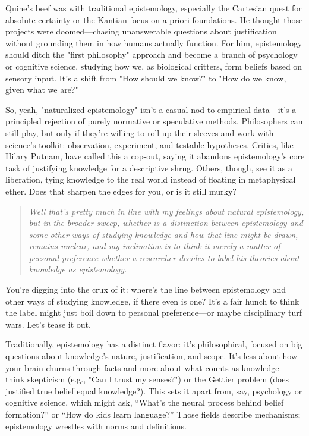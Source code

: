\documentclass[10pt,titlepage]{book}
\begin{document}
Quine’s beef was with traditional epistemology, especially the Cartesian quest for absolute certainty or the Kantian focus on a priori foundations. He thought those projects were doomed—chasing unanswerable questions about justification without grounding them in how humans actually function. For him, epistemology should ditch the "first philosophy" approach and become a branch of psychology or cognitive science, studying how we, as biological critters, form beliefs based on sensory input. It’s a shift from "How should we know?" to "How do we know, given what we are?"

So, yeah, "naturalized epistemology" isn’t a casual nod to empirical data—it’s a principled rejection of purely normative or speculative methods. Philosophers can still play, but only if they’re willing to roll up their sleeves and work with science’s toolkit: observation, experiment, and testable hypotheses. Critics, like Hilary Putnam, have called this a cop-out, saying it abandons epistemology’s core task of justifying knowledge for a descriptive shrug. Others, though, see it as a liberation, tying knowledge to the real world instead of floating in metaphysical ether.
Does that sharpen the edges for you, or is it still murky?

\begin{quote}
  {\it Well that's pretty much in line with my feelings about natural epistemology, but in the broader sweep, whether is a distinction between epistemology and some other ways of studying knowledge and how that line might be drawn, remains unclear, and my inclination is to think it merely a matter of personal preference whether a researcher decides to label his theories about knowledge as epistemology.}
\end{quote}

You’re digging into the crux of it: where’s the line between epistemology and other ways of studying knowledge, if there even is one? It’s a fair hunch to think the label might just boil down to personal preference—or maybe disciplinary turf wars. Let’s tease it out.

Traditionally, epistemology has a distinct flavor: it’s philosophical, focused on big questions about knowledge’s nature, justification, and scope. It’s less about how your brain churns through facts and more about what counts as knowledge—think skepticism (e.g., "Can I trust my senses?") or the Gettier problem (does justified true belief equal knowledge?). This sets it apart from, say, psychology or cognitive science, which might ask, “What’s the neural process behind belief formation?” or “How do kids learn language?” Those fields describe mechanisms; epistemology wrestles with norms and definitions.
\end{document}
